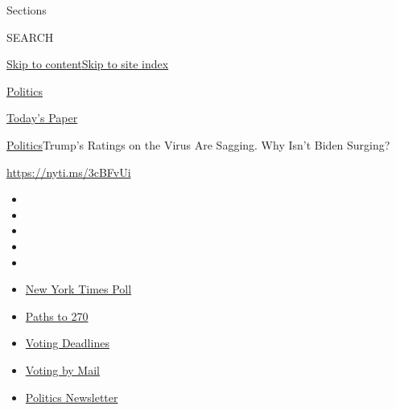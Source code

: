 Sections

SEARCH

\protect\hyperlink{site-content}{Skip to
content}\protect\hyperlink{site-index}{Skip to site index}

\href{https://www.nytimes3xbfgragh.onion/section/politics}{Politics}

\href{https://myaccount.nytimes3xbfgragh.onion/auth/login?response_type=cookie\&client_id=vi}{}

\href{https://www.nytimes3xbfgragh.onion/section/todayspaper}{Today's
Paper}

\href{/section/politics}{Politics}\textbar{}Trump's Ratings on the Virus
Are Sagging. Why Isn't Biden Surging?

\url{https://nyti.ms/3cBFvUi}

\begin{itemize}
\item
\item
\item
\item
\item
\end{itemize}

\begin{itemize}
\item
  \href{https://www.nytimes3xbfgragh.onion/2020/09/12/us/politics/biden-trump-poll-wisconsin-minnesota.html?action=click\&pgtype=Article\&state=default\&region=TOP_BANNER\&context=storylines_menu}{New
  York Times Poll}
\item
  \href{https://www.nytimes3xbfgragh.onion/interactive/2020/us/elections/election-states-biden-trump.html?action=click\&pgtype=Article\&state=default\&region=TOP_BANNER\&context=storylines_menu}{Paths
  to 270}
\item
  \href{https://www.nytimes3xbfgragh.onion/interactive/2019/us/elections/2020-presidential-election-calendar.html?action=click\&pgtype=Article\&state=default\&region=TOP_BANNER\&context=storylines_menu}{Voting
  Deadlines}
\item
  \href{https://www.nytimes3xbfgragh.onion/interactive/2020/08/31/us/politics/vote-by-mail-deadlines.html?action=click\&pgtype=Article\&state=default\&region=TOP_BANNER\&context=storylines_menu}{Voting
  by Mail}
\item
  \href{https://www.nytimes3xbfgragh.onion/newsletters/politics?action=click\&pgtype=Article\&state=default\&region=TOP_BANNER\&context=storylines_menu}{Politics
  Newsletter}
\end{itemize}

